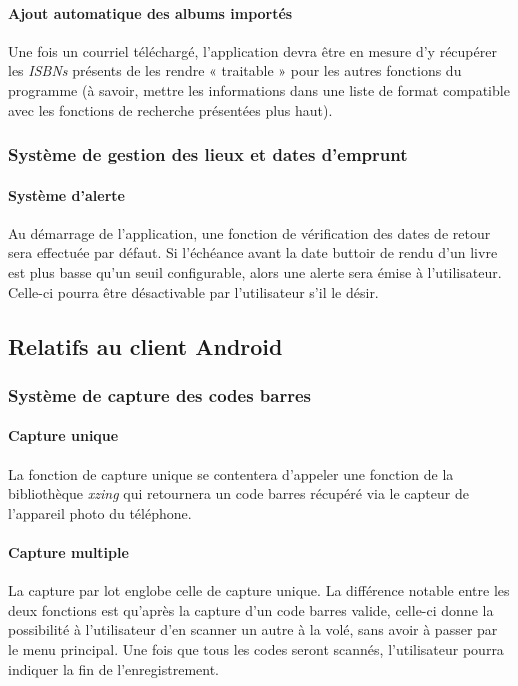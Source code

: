 \paragraph{Ajout automatique des albums importés}
Une fois un courriel téléchargé, l'application devra être en mesure d'y récupérer les \emph{ISBNs} présents de les rendre « traitable » pour les autres fonctions du programme 
(à savoir, mettre les informations dans une liste de format compatible avec les fonctions de recherche présentées plus haut).  

\subsubsection{Système de gestion des lieux et dates d'emprunt}

\paragraph{Système d'alerte}
Au démarrage de l'application, une fonction de vérification des dates de retour sera effectuée par défaut. 
Si l'échéance avant la date buttoir de rendu d'un livre est plus basse qu'un seuil configurable, 
	alors une alerte sera émise à l'utilisateur. 
Celle-ci pourra être désactivable par l'utilisateur s'il le désir. 

\subsection{Relatifs au client Android}

\subsubsection{Système de capture des codes barres}

\paragraph{Capture unique}
La fonction de capture unique se contentera d'appeler une fonction de la bibliothèque \emph{xzing} qui retournera un code barres récupéré via le capteur de l'appareil photo du téléphone.

\paragraph{Capture multiple}
La capture par lot englobe celle de capture unique.
La différence notable entre les deux fonctions est qu'après la capture d'un code barres valide, celle-ci donne la possibilité à l'utilisateur d'en scanner un autre à la volé,
	sans avoir à passer par le menu principal. 
Une fois que tous les codes seront scannés, l'utilisateur pourra indiquer la fin de l'enregistrement. 


